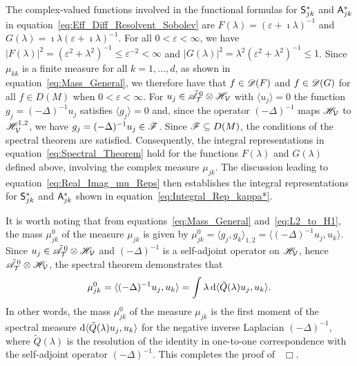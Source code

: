 \documentclass[amsa]{ipart}
\begin{document}
The
complex-valued functions involved in the functional formulas for
$\mathsf{S}^*_{jk}$ and $\mathsf{A}^*_{jk}$ in
equation~\eqref{eq:Eff_Diff_Resolvent_Sobolev} are $F(\lambda)=(\varepsilon+\imath\lambda)^{-1}$
and $G(\lambda)=\imath\lambda(\varepsilon+\imath\lambda)^{-1}$. For all $0<\varepsilon<\infty$, 
we have $|F(\lambda)|^2=(\varepsilon^2+\lambda^2)^{-1}\leq\varepsilon^{-2}<\infty$ and 
$|G(\lambda)|^2=\lambda^2(\varepsilon^2+\lambda^2)^{-1}\leq 1$. Since $\mu_{kk}$ is a finite measure
for all $k=1,\ldots,d$, as shown in equation~\eqref{eq:Mass_General}, we
therefore have 
that $f\in\mathscr{D}(F)$ and $f\in\mathscr{D}(G)$ for all $f\in D(M)$ when $0<\varepsilon<\infty$. 
For $u_j\in\tilde{\mathscr{A}}^{\,0}_{\mathcal{T}}\otimes\mathscr{H}_{\mathcal{V}}$ with $\langle u_j\rangle=0$ the
function $g_j=(-\Delta)^{-1}u_j$ satisfies $\langle g_j\rangle=0$ and, 
since the operator $(-\Delta)^{-1}$ maps $\mathscr{H}_{\mathcal{V}}$ to   
$\mathscr{H}^{1,2}_{\mathcal{V}}$, we have $g_j=(-\Delta)^{-1}u_j\in\mathscr{F}$. Since
$\mathscr{F}\subseteq D(M)$, the conditions of the spectral theorem are 
satisfied. Consequently, the integral representations in
equation~\eqref{eq:Spectral_Theorem} hold for the functions $F(\lambda)$ and
$G(\lambda)$ defined above, involving the complex measure $\mu_{jk}$. The
discussion leading to equation~\eqref{eq:Real_Imag_mu_Reps} then
establishes the integral representations for $\mathsf{S}^*_{jk}$ and
$\mathsf{A}^*_{jk}$ shown in equation~\eqref{eq:Integral_Rep_kappa*}.




It is worth noting that from
equations~\eqref{eq:Mass_General} and~\eqref{eq:L2_to_H1}, the mass 
$\mu_{jk}^0$ of the measure $\mu_{jk}$ is given by
$\mu_{jk}^0=\langle g_j,g_k\rangle_{1,2}=\langle(-\Delta)^{-1}u_j,u_k\rangle$. Since
$u_j\in\tilde{\mathscr{A}}^{\,0}_{\mathcal{T}}\otimes\mathscr{H}_{\mathcal{V}}$ and $(-\Delta)^{-1}$ is a
self-adjoint operator on $\mathscr{H}_{\mathcal{V}}$, hence
$\tilde{\mathscr{A}}^{\,0}_{\mathcal{T}}\otimes\mathscr{H}_{\mathcal{V}}$, the spectral theorem demonstrates
that    
%
\begin{align}\label{eq:Laplacian_moment}
  \mu_{jk}^0=\langle(-\Delta)^{-1}u_j,u_k\rangle=\int\lambda\,\d\langle\tilde{Q}(\lambda)u_j,u_k\rangle.
\end{align}
%
In other words, the mass $\mu_{jk}^0$ of the measure $\mu_{jk}$ is the
first moment of the spectral measure $\mathrm{d}\langle\tilde{Q}(\lambda)u_j,u_k\rangle$ for 
the negative inverse Laplacian $(-\Delta)^{-1}$, where $\tilde{Q}(\lambda)$ is
the resolution of the identity in one-to-one correspondence with the 
self-adjoint operator $(-\Delta)^{-1}$. This completes the proof
of~ $\Box$.  
\end{document}
